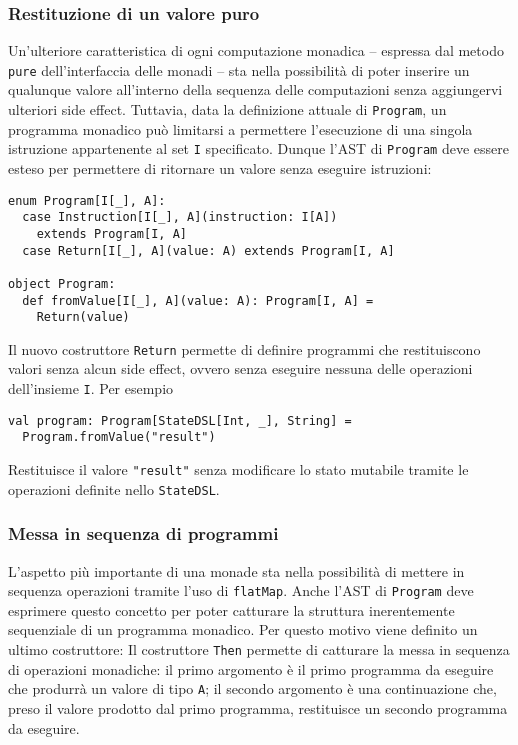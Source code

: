 \subsubsection{Restituzione di un valore puro}
Un'ulteriore caratteristica di ogni computazione monadica -- espressa dal metodo \lstinline{pure} dell'interfaccia delle monadi -- sta nella possibilità di poter inserire un qualunque valore all'interno della sequenza delle computazioni senza aggiungervi ulteriori side effect.
Tuttavia, data la definizione attuale di \lstinline{Program}, un programma monadico può limitarsi a permettere l'esecuzione di una singola istruzione appartenente al set \lstinline{I} specificato. Dunque l'\ac{AST} di \lstinline{Program} deve essere esteso per permettere di ritornare un valore senza eseguire istruzioni:
\begin{lstlisting}[language=scala3]
enum Program[I[_], A]:
  case Instruction[I[_], A](instruction: I[A])
    extends Program[I, A]
  case Return[I[_], A](value: A) extends Program[I, A]

object Program:
  def fromValue[I[_], A](value: A): Program[I, A] =
    Return(value)
\end{lstlisting}

Il nuovo costruttore \lstinline{Return} permette di definire programmi che restituiscono valori senza alcun side effect, ovvero senza eseguire nessuna delle operazioni dell'insieme \lstinline{I}. Per esempio
\begin{lstlisting}[language=scala3]
val program: Program[StateDSL[Int, _], String] =
  Program.fromValue("result")
\end{lstlisting}
Restituisce il valore \lstinline{"result"} senza modificare lo stato mutabile tramite le operazioni definite nello \lstinline{StateDSL}.

\subsubsection{Messa in sequenza di programmi}
L'aspetto più importante di una monade sta nella possibilità di mettere in sequenza operazioni tramite l'uso di \lstinline{flatMap}.
Anche l'\ac{AST} di \lstinline{Program} deve esprimere questo concetto per poter catturare la struttura inerentemente sequenziale di un programma monadico. Per questo motivo viene definito un ultimo costruttore:
Il costruttore \lstinline{Then} permette di catturare la messa in sequenza di operazioni monadiche: il primo argomento è il primo programma da eseguire che produrrà un valore di tipo \lstinline{A}; il secondo argomento è una continuazione che, preso il valore prodotto dal primo programma, restituisce un secondo programma da eseguire.

